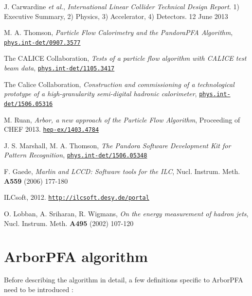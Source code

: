 \documentclass[12pt]{article}
\begin{document}
\begin{thebibliography}{99}

J. Carwardine {\it et al.},  \emph{International Linear Collider Technical Design Report}. 1) Executive Summary, 2) Physics, 3) Accelerator, 4) Detectors. 12 June 2013

M. A. Thomson, \emph{Particle Flow Calorimetry and the PandoraPFA Algorithm}, \href{http://www.arxiv.org/abs/0907.3577}{\tt phys.int-det/0907.3577}

The CALICE Collaboration, \emph{Tests of a particle flow algorithm with CALICE test beam data}, \href{http://www.arxiv.org/abs/1105.3417}{\tt phys.int-det/1105.3417}

The Calice Collaboration, \emph{Construction and commissioning of a technological prototype of a high-granularity semi-digital hadronic calorimeter}, \href{http://www.arxiv.org/abs/1506.05316}{\tt phys.int-det/1506.05316}

M. Ruan, \emph{Arbor, a new approach of the Particle Flow Algorithm}, Proceeding of CHEF 2013. \href{http://www.arxiv.org/abs/1403.4784}{\tt hep-ex/1403.4784}

J. S. Marshall, M. A. Thomson, \emph{The Pandora Software Development Kit for Pattern Recognition}, \href{http://www.arxiv.org/abs/1506.05348}{\tt phys.int-det/1506.05348}

F. Gaede, {\it Marlin and LCCD: Software tools for the ILC}, Nucl. Instrum. Meth. {\bf A559} (2006) 177-180

ILCsoft, 2012. \href{http://ilcsoft.desy.de/portal}{\tt http://ilcsoft.desy.de/portal}

O. Lobban, A. Sriharan, R. Wigmans,  \emph{On the energy measurement of hadron jets}, Nucl. Instrum. Meth. {\bf A495} (2002) 107-120

\end{thebibliography}

\newpage

\clearpage
\appendix

\section{ArborPFA algorithm}
\label{ARBOR_ALGO_DESCRIPTION}

Before describing the algorithm in detail, a few definitions specific to ArborPFA need to be introduced :
\end{document}
